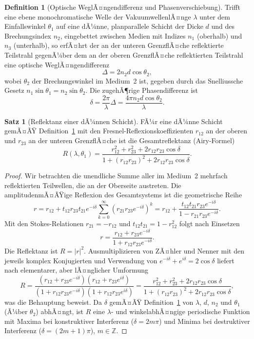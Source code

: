﻿\documentclass[a4paper,12pt]{article}
\theoremstyle{definition}
\newtheorem{definition}{Definition}
\newtheorem{satz}{Satz}
\begin{document}
\begin{definition}[Optische WeglÃ¤ngendifferenz und Phasenverschiebung]
	\label{def:owl}
	Trifft eine ebene monochromatische Welle der VakuumwellenlÃ¤nge $\lambda$
	unter dem Einfallswinkel $\theta_1$ auf eine dÃ¼nne, planparallele Schicht
	der Dicke $d$ und des Brechungsindex $n_2$, eingebettet zwischen Medien
	mit Indizes $n_1$ (oberhalb) und $n_3$ (unterhalb), so erfÃ¤hrt der an der
	unteren GrenzflÃ¤che reflektierte Teilstrahl gegenÃ¼ber dem an der oberen
	GrenzflÃ¤che reflektierten Teilstrahl eine optische WeglÃ¤ngendifferenz
	\[
	\Delta = 2 n_2 d \cos\theta_2,
	\]
	wobei $\theta_2$ der Brechungswinkel im Medium~2 ist, gegeben durch das
	Snelliussche Gesetz $n_1 \sin\theta_1 = n_2 \sin\theta_2$.
	Die zugehÃ¶rige Phasendifferenz ist
	\[
	\delta = \frac{2\pi}{\lambda}\Delta = \frac{4\pi n_2 d \cos\theta_2}{\lambda}.
	\]
\end{definition}

\begin{satz}[Reflektanz einer dÃ¼nnen Schicht]
	\label{satz:airy}
	FÃ¼r eine dÃ¼nne Schicht gemÃ¤ÃŸ Definition~\ref{def:owl} mit den
	Fresnel-Reflexionskoeffizienten $r_{12}$ an der oberen und $r_{23}$ an
	der unteren GrenzflÃ¤che ist die Gesamtreflektanz (Airy-Formel)
	\[
	R(\lambda,\theta_1) = \frac{r_{12}^2 + r_{23}^2 + 2 r_{12} r_{23}
		\cos\delta}{1 + (r_{12} r_{23})^2 + 2 r_{12} r_{23} \cos\delta}.
	\]
\end{satz}

\begin{proof}
	Wir betrachten die unendliche Summe aller im Medium~2 mehrfach
	reflektierten Teilwellen, die an der Oberseite austreten. Die
	amplitudenmÃ¤ÃŸige Reflexion des Gesamtsystems ist die geometrische Reihe
	\[
	r = r_{12} + t_{12} r_{23} t_{21} e^{-i\delta}
	\sum_{k=0}^{\infty} \left(r_{21} r_{23} e^{-i\delta}\right)^k
	= r_{12} + \frac{t_{12} t_{21} r_{23} e^{-i\delta}}
	{1 - r_{21} r_{23} e^{-i\delta}}.
	\]
	Mit den Stokes-Relationen $r_{21} = -r_{12}$ und
	$t_{12} t_{21} = 1 - r_{12}^2$ folgt nach Einsetzen
	\[
	r = \frac{r_{12} + r_{23} e^{-i\delta}}{1 + r_{12} r_{23} e^{-i\delta}}.
	\]
	Die Reflektanz ist $R = |r|^2$. Ausmultiplizieren von ZÃ¤hler und Nenner
	mit den jeweils komplex Konjugierten und Verwendung von
	$e^{-i\delta} + e^{i\delta} = 2\cos\delta$ liefert nach
	elementarer, aber lÃ¤nglicher Umformung
	\[
	R = \frac{(r_{12}+r_{23}e^{-i\delta})(r_{12}+r_{23}e^{i\delta})}
	{(1+r_{12}r_{23}e^{-i\delta})(1+r_{12}r_{23}e^{i\delta})}
	= \frac{r_{12}^2 + r_{23}^2 + 2 r_{12} r_{23}\cos\delta}
	{1 + (r_{12}r_{23})^2 + 2 r_{12}r_{23}\cos\delta},
	\]
	was die Behauptung beweist. Da $\delta$ gemÃ¤ÃŸ Definition~\ref{def:owl}
	von $\lambda$, $d$, $n_2$ und $\theta_1$ (Ã¼ber $\theta_2$) abhÃ¤ngt, ist
	$R$ eine $\lambda$- und winkelabhÃ¤ngige periodische Funktion mit
	Maxima bei konstruktiver Interferenz ($\delta = 2m\pi$) und Minima bei
	destruktiver Interferenz ($\delta = (2m+1)\pi$), $m \in \mathbb{Z}$.
\end{proof}
\end{document}
